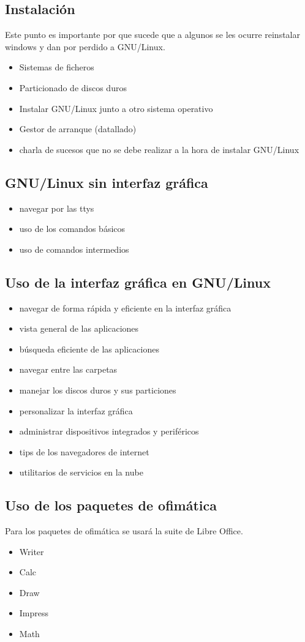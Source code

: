 \documentclass[11pt,letterpaper]{article}
\begin{document}
\subsection{Instalación} Este punto es importante por que sucede que a algunos se les ocurre reinstalar windows y dan por perdido a GNU/Linux.
\begin{itemize}
\item Sistemas de ficheros
\item Particionado de discos duros
\item Instalar GNU/Linux junto a otro sistema operativo
\item Gestor de arranque (datallado)
\item charla de sucesos que no se debe realizar a la hora de instalar GNU/Linux
\end{itemize}
\subsection{GNU/Linux sin interfaz gráfica}
\begin{itemize}
\item navegar por las ttys
\item uso de los comandos básicos
\item uso de comandos intermedios
\end{itemize}

\subsection{Uso de la interfaz gráfica en GNU/Linux}
\begin{itemize}
\item navegar de forma rápida y eficiente en la interfaz gráfica
\item vista general de las aplicaciones
\item búsqueda eficiente de las aplicaciones
\item navegar entre las carpetas
\item manejar los discos duros y sus particiones
\item personalizar la interfaz gráfica
\item administrar dispositivos integrados y periféricos
\item tips de los navegadores de internet
\item utilitarios de servicios en la nube
\end{itemize}
\subsection{Uso de los paquetes de ofimática}
Para los paquetes de ofimática se usará la suite de Libre Office.
\begin{itemize}
\item Writer
\item Calc
\item Draw
\item Impress
\item Math
\end{itemize}
\end{document}
